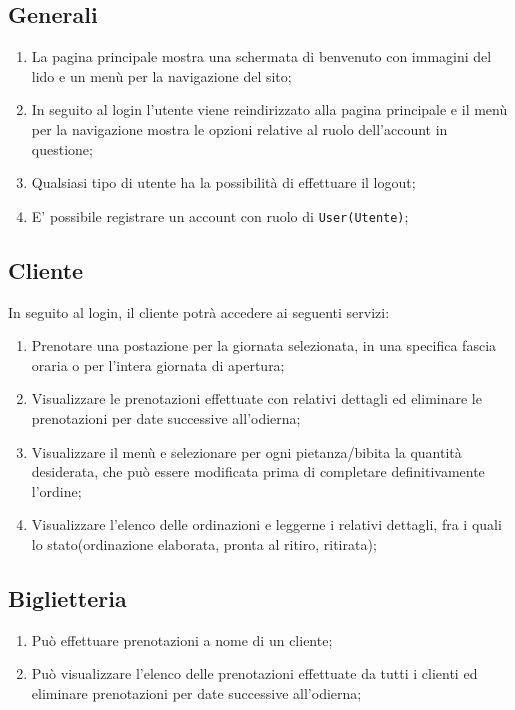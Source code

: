 \documentclass{article}
\begin{document}
\subsection{Generali}
\begin{enumerate}
	\item La pagina principale mostra una schermata di benvenuto con immagini del lido e un menù per la navigazione del sito;
	\item In seguito al login l'utente viene reindirizzato alla pagina principale e il menù per la navigazione mostra le opzioni relative al ruolo dell'account in questione;
	\item Qualsiasi tipo di utente ha la possibilità di effettuare il logout;
	\item E' possibile registrare un account con ruolo di \texttt{User(Utente)};
\end{enumerate}

\subsection{Cliente}
In seguito al login, il cliente potrà accedere ai seguenti servizi:
\begin{enumerate}
	\item Prenotare una postazione per la giornata selezionata, in una specifica fascia oraria o per l'intera giornata di apertura;
	\item Visualizzare le prenotazioni effettuate con relativi dettagli ed eliminare le prenotazioni per date successive all'odierna;
	\item Visualizzare il menù e selezionare per ogni pietanza/bibita la quantità desiderata, che può essere modificata prima di completare definitivamente l'ordine;
	\item Visualizzare l'elenco delle ordinazioni e leggerne i relativi dettagli, fra i quali lo stato(ordinazione elaborata, pronta al ritiro, ritirata);
\end{enumerate}

\subsection{Biglietteria}
\begin{enumerate}
	\item Può effettuare prenotazioni a nome di un cliente;
	\item Può visualizzare l'elenco delle prenotazioni effettuate da tutti i clienti ed eliminare prenotazioni per date successive all'odierna;
\end{enumerate}
\end{document}
